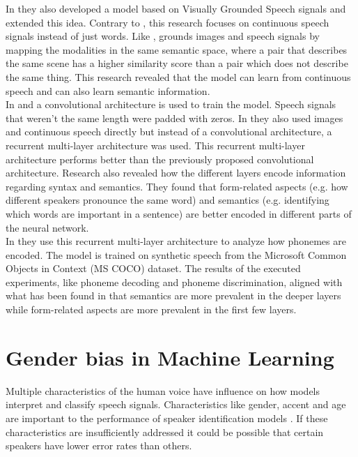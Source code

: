 \documentclass[a4paper, oneside]{book}
\begin{document}
In \cite{harwath2016unsupervised} they also developed a model based on Visually Grounded Speech signals and extended this idea. Contrary to \cite{HarwathG15}, this research focuses on continuous speech signals instead of just words. Like \cite{HarwathG15}, \cite{harwath2016unsupervised} grounds images and speech signals by mapping the modalities in the same semantic space, where a pair that describes the same scene has a higher similarity score than a pair which does not describe the same thing. This research revealed that the model can learn from continuous speech and can also learn semantic information. \\

In \cite{HarwathG15} and \cite{harwath2016unsupervised} a convolutional architecture is used to train the model. Speech signals that weren't the same length were padded with zeros. In \cite{ChrupalaGA17} they also used images and continuous speech directly but instead of a convolutional architecture, a recurrent multi-layer architecture was used. This recurrent multi-layer architecture performs better than the previously proposed convolutional architecture. Research also revealed how the different layers encode information regarding syntax and semantics. They found that form-related aspects (e.g. how different speakers pronounce the same word) and semantics (e.g. identifying which words are important in a sentence) are better encoded in different parts of the neural network. \\

In \cite{AlishahiBC17} they use this recurrent multi-layer architecture to analyze how phonemes are encoded. The model is trained on synthetic speech from the Microsoft Common Objects in Context (MS COCO) dataset. The results of the executed experiments, like phoneme decoding and phoneme discrimination, aligned with what has been found in \cite{ChrupalaGA17} that semantics are more prevalent in the deeper layers while form-related aspects are more prevalent in the first few layers. 

\section{Gender bias in Machine Learning}\label{background:gender-bias-in-machine-learning}
Multiple characteristics of the human voice have influence on how models interpret and classify speech signals. Characteristics like gender, accent and age are important to the performance of speaker identification models \cite{abdulla2001improving}. If these characteristics are insufficiently addressed it could be possible that certain speakers have lower error rates than others. \\
\end{document}

